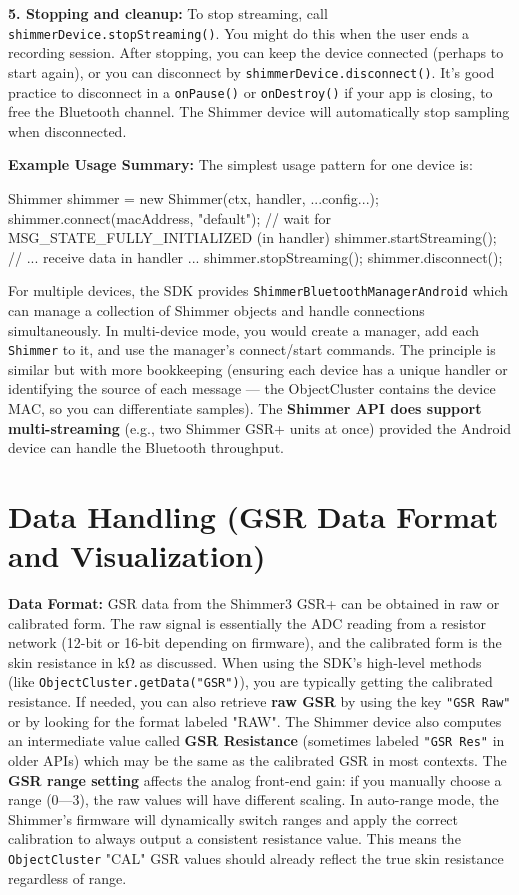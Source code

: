 \textbf{5. Stopping and cleanup:} To stop streaming, call
\texttt{shimmerDevice.stopStreaming()}. You might do this when the user ends a
recording session. After stopping, you can keep the device connected
(perhaps to start again), or you can disconnect by
\texttt{shimmerDevice.disconnect()}. It's good practice to disconnect in a
\texttt{onPause()} or \texttt{onDestroy()} if your app is closing, to free the
Bluetooth channel. The Shimmer device will automatically stop sampling
when disconnected.

\textbf{Example Usage Summary:} The simplest usage pattern for one device is:

    Shimmer shimmer = new Shimmer(ctx, handler, ...config...);
    shimmer.connect(macAddress, "default");
    // wait for MSG_STATE_FULLY_INITIALIZED (in handler)
    shimmer.startStreaming();
    // ... receive data in handler ...
    shimmer.stopStreaming();
    shimmer.disconnect();

For multiple devices, the SDK provides \texttt{ShimmerBluetoothManagerAndroid}
which can manage a collection of Shimmer objects and handle connections
simultaneously. In multi-device mode, you would create a manager, add
each \texttt{Shimmer} to it, and use the manager's connect/start commands. The
principle is similar but with more bookkeeping (ensuring each device has
a unique handler or identifying the source of each message --- the
ObjectCluster contains the device MAC, so you can differentiate
samples\cite{DriverStressThermal2020}).
The \textbf{Shimmer API does support multi-streaming} (e.g., two Shimmer GSR+
units at once) provided the Android device can handle the Bluetooth
throughput\cite{DriverStressThermal2020}\cite{ContactlessStressThermal2022}.

\section{Data Handling (GSR Data Format and Visualization)}

\textbf{Data Format:} GSR data from the Shimmer3 GSR+ can be obtained in raw
or calibrated form. The raw signal is essentially the ADC reading from a
resistor network (12-bit or 16-bit depending on firmware), and the
calibrated form is the skin resistance in kΩ as discussed. When using
the SDK's high-level methods (like \texttt{ObjectCluster.getData("GSR")}), you
are typically getting the calibrated resistance. If needed, you can also
retrieve \textbf{raw GSR} by using the key \texttt{"GSR Raw"} or by looking for the
format labeled "RAW". The Shimmer device also computes an intermediate
value called \textbf{GSR Resistance} (sometimes labeled \texttt{"GSR Res"} in older
APIs) which may be the same as the calibrated GSR in most contexts. The
\textbf{GSR range setting} affects the analog front-end gain: if you manually
choose a range (0---3), the raw values will have different scaling. In
auto-range mode, the Shimmer's firmware will dynamically switch ranges
and apply the correct calibration to always output a consistent
resistance
value\cite{ElectrodermalActivityWiki}.
This means the \texttt{ObjectCluster} "CAL" GSR values should already reflect
the true skin resistance regardless of range.

